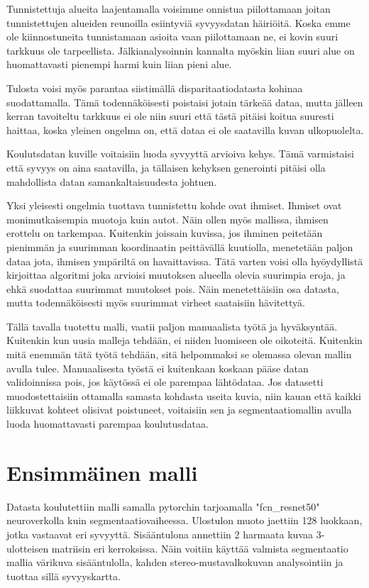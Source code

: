 Tunnistettuja alueita laajentamalla voisimme onnistua piilottamaan joitan tunnistettujen alueiden reunoilla esiintyviä syvyysdatan häiriöitä.
Koska emme ole kiinnostuneita tunnistamaan asioita vaan piilottamaan ne, ei kovin suuri tarkkuus ole tarpeellista.
Jälkianalysoinnin kannalta myöskin liian suuri alue on huomattavasti pienempi harmi kuin liian pieni alue.

Tulosta voisi myös parantaa siistimällä disparitaatiodatasta kohinaa suodattamalla.
Tämä todennäköisesti poistaisi jotain tärkeää dataa,
mutta jälleen kerran tavoiteltu tarkkuus ei ole niin suuri että tästä pitäisi koitua suuresti haittaa,
koska yleinen ongelma on, että dataa ei ole saatavilla kuvan ulkopuolelta.

Koulutsdatan kuville voitaisiin luoda syvyyttä arvioiva kehys.
Tämä varmistaisi että syvyys on aina saatavilla, 
ja tällaisen kehyksen generointi pitäisi olla mahdollista datan samankaltaisuudesta johtuen.

Yksi yleisesti ongelmia tuottava tunnistettu kohde ovat ihmiset.
Ihmiset ovat monimutkaisempia muotoja kuin autot.
Näin ollen myös mallissa, ihmisen erottelu on tarkempaa.
Kuitenkin joissain kuvissa,
jos ihminen peitetään pienimmän ja suurimman koordinaatin peittävällä kuutiolla,
menetetään paljon dataa jota, ihmisen ympäriltä on havaittavissa.
Tätä varten voisi olla hyöydyllistä kirjoittaa algoritmi joka arvioisi muutoksen alueella olevia suurimpia eroja,
ja ehkä suodattaa suurimmat muutokset pois. Näin menetettäisiin osa datasta,
mutta todennäköisesti myös suurimmat virheet saataisiin hävitettyä. 

Tällä tavalla tuotettu malli, vaatii paljon manuaalista työtä ja hyväksyntää.
Kuitenkin kun uusia malleja tehdään, ei niiden luomiseen ole oikoteitä.
Kuitenkin mitä enemmän tätä työtä tehdään,
sitä helpommaksi se olemassa olevan mallin avulla tulee.
Manuaalisesta työstä ei kuitenkaan koskaan pääse datan validoinnissa pois,
jos käytössä ei ole parempaa lähtödataa.
Jos datasetti muodostettaisiin ottamalla samasta kohdasta useita kuvia,
niin kauan että kaikki liikkuvat kohteet olisivat poistuneet,
voitaisiin sen ja segmentaatiomallin avulla luoda huomattavasti parempaa koulutusdataa. 

\section{Ensimmäinen malli}

Datasta koulutettiin malli samalla pytorchin tarjoamalla "fcn\_resnet50" \cite{pytorchfcnresnet50} neuroverkolla kuin segmentaatiovaiheessa.
Ulostulon muoto jaettiin 128 luokkaan, jotka vastaavat eri syvyyttä.
Sisääntulona annettiin 2 harmaata kuvaa 3-ulotteisen matriisin eri kerroksissa.
Näin voitiin käyttää valmista segmentaatio mallia värikuva sisääntulolla, kahden stereo-mustavalkokuvan analysointiin ja tuottaa sillä syvyyskartta.

